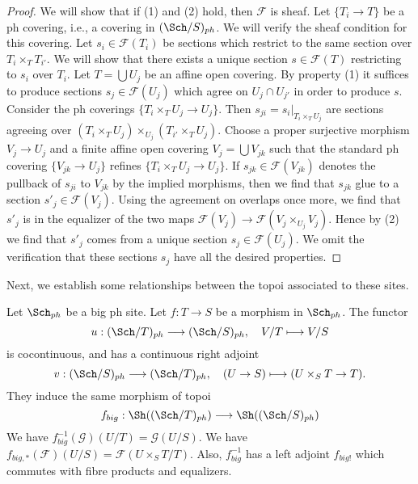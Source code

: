 \begin{proof}
We will show that if (1) and (2) hold, then $\mathcal{F}$ is sheaf.
Let $\{T_i \to T\}$ be a ph covering, i.e., a covering in $(\Sch/S)_{ph}$.
We will verify the sheaf condition for this covering.
Let $s_i \in \mathcal{F}(T_i)$ be sections which restrict to the same
section over $T_i \times_T T_{i'}$. We will show that there exists a
unique section $s \in \mathcal{F}(T)$ restricting to $s_i$ over $T_i$.
Let $T = \bigcup U_j$ be an affine open covering.
By property (1) it suffices to produce sections $s_j \in \mathcal{F}(U_j)$
which agree on $U_j \cap U_{j'}$ in order to produce $s$.
Consider the ph coverings $\{T_i \times_T U_j \to U_j\}$.
Then $s_{ji} = s_i|_{T_i \times_T U_j}$ are sections agreeing
over $(T_i \times_T U_j) \times_{U_j} (T_{i'} \times_T U_j)$.
Choose a proper surjective morphism $V_j \to U_j$ and a finite affine
open covering $V_j = \bigcup V_{jk}$ such that the standard ph covering
$\{V_{jk} \to U_j\}$ refines $\{T_i \times_T U_j \to U_j\}$.
If $s_{jk} \in \mathcal{F}(V_{jk})$
denotes the pullback of $s_{ji}$ to $V_{jk}$ by the
implied morphisms, then we find that $s_{jk}$ glue to a section
$s'_j \in \mathcal{F}(V_j)$. Using the agreement on overlaps
once more, we find that $s'_j$ is in the equalizer of the two
maps $\mathcal{F}(V_j) \to \mathcal{F}(V_j \times_{U_j} V_j)$.
Hence by (2) we find that $s'_j$ comes from a unique section
$s_j \in \mathcal{F}(U_j)$. We omit the verification that these
sections $s_j$ have all the desired properties.
\end{proof}

\noindent
Next, we establish some relationships between the topoi
associated to these sites.

\begin{lemma}
\label{lemma-morphism-big-ph}
Let $\Sch_{ph}$ be a big ph site.
Let $f : T \to S$ be a morphism in $\Sch_{ph}$.
The functor
$$
u : (\Sch/T)_{ph} \longrightarrow (\Sch/S)_{ph},
\quad
V/T \longmapsto V/S
$$
is cocontinuous, and has a continuous right adjoint
$$
v : (\Sch/S)_{ph} \longrightarrow (\Sch/T)_{ph},
\quad
(U \to S) \longmapsto (U \times_S T \to T).
$$
They induce the same morphism of topoi
$$
f_{big} :
\Sh((\Sch/T)_{ph})
\longrightarrow
\Sh((\Sch/S)_{ph})
$$
We have $f_{big}^{-1}(\mathcal{G})(U/T) = \mathcal{G}(U/S)$.
We have $f_{big, *}(\mathcal{F})(U/S) = \mathcal{F}(U \times_S T/T)$.
Also, $f_{big}^{-1}$ has a left adjoint $f_{big!}$ which commutes with
fibre products and equalizers.
\end{lemma}

